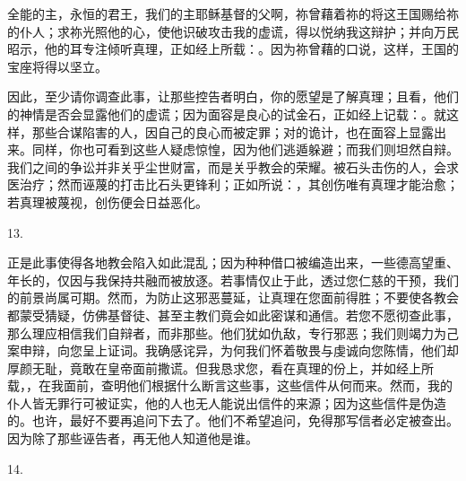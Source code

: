全能的主，永恒的君王，我们的主耶稣基督的父啊，祢曾藉着祢的将这王国赐给祢的仆人；求祢光照他的心，使他识破攻击我的虚谎，得以悦纳我这辩护；并向万民昭示，他的耳专注倾听真理，正如经上所载：。因为祢曾藉的口说，这样，王国的宝座将得以坚立。\par

因此，至少请你调查此事，让那些控告者明白，你的愿望是了解真理；且看，他们的神情是否会显露他们的虚谎；因为面容是良心的试金石，正如经上记载：。就这样，那些合谋陷害的人，因自己的良心而被定罪；对的诡计，也在面容上显露出来。同样，你也可看到这些人疑虑惊惶，因为他们逃遁躲避；而我们则坦然自辩。我们之间的争讼并非关乎尘世财富，而是关乎教会的荣耀。被石头击伤的人，会求医治疗；然而诬蔑的打击比石头更锋利；正如所说：，其创伤唯有真理才能治愈；若真理被蔑视，创伤便会日益恶化。\par

13. \par

正是此事使得各地教会陷入如此混乱；因为种种借口被编造出来，一些德高望重、年长的，仅因与我保持共融而被放逐。若事情仅止于此，透过您仁慈的干预，我们的前景尚属可期。然而，为防止这邪恶蔓延，让真理在您面前得胜；不要使各教会都蒙受猜疑，仿佛基督徒、甚至主教们竟会如此密谋和通信。若您不愿彻查此事，那么理应相信我们自辩者，而非那些。他们犹如仇敌，专行邪恶；我们则竭力为己案申辩，向您呈上证词。我确感诧异，为何我们怀着敬畏与虔诚向您陈情，他们却厚颜无耻，竟敢在皇帝面前撒谎。但我恳求您，看在真理的份上，并如经上所载，，在我面前，查明他们根据什么断言这些事，这些信件从何而来。然而，我的仆人皆无罪行可被证实，他的人也无人能说出信件的来源；因为这些信件是伪造的。也许，最好不要再追问下去了。他们不希望追问，免得那写信者必定被查出。因为除了那些诬告者，再无他人知道他是谁。\par

14. \par

